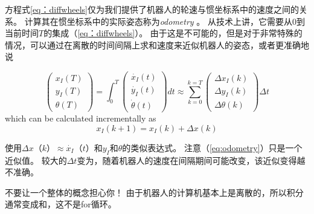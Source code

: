 方程式\ref {eq：diffwheels}仅为我们提供了机器人的轮速与惯坐标系中的速度之间的关系。 计算其在惯坐标系中的实际姿态称为\emph {odometry} 。 从技术上讲，它需要从0到当前时间$ T $的集成（\ref {eq：diffwheels}）。 由于这是不可能的，但是对于非常特殊的情况，可以通过在离散的时间间隔上求和速度来近似机器人的姿态，或者更准确地说

\begin{equation}
\left(\begin{array}{c} {x_I}(T)\\{y_I}(T)\\{\theta}(T)\end{array}\right)=
\int_0^T \left(\begin{array}{c} \dot{x_I}(t)\\\dot{y_I}(t)\\\dot{\theta}(t)\end{array}\right) dt \approx 
\sum_{k=0}^{k=T}\left(\begin{array}{c} \Delta{x_I}(k)\\\Delta{y_I}(k)\\\Delta{\theta}(k)\end{array}\right)\Delta t
\end{equation} which can be calculated incrementally as
\begin{equation}\label{eq:odometry}
x_I(k+1)=x_I(k)+\Delta x (k)
\end{equation}

使用$ \Delta x（k）\approx\dot {x_I}（t）$和$ y_I $和$ \theta $的类似表达式。 注意（\ref{eq:odometry}）只是一个近似值。 较大的$ \Delta t $变为，随着机器人的速度在间隔期间可能改变，该近似变得越不准确。

\begin{framed}

不要让一个整体的概念担心你！ 由于机器人的计算机基本上是离散的，所以积分通常变成和，这不是for循环。
\end{framed}



